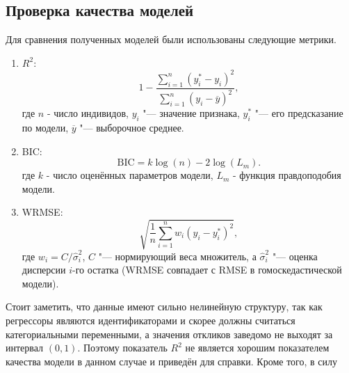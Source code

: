 \documentclass{article}
\begin{document}
\subsection{Проверка качества моделей}
Для сравнения полученных моделей были использованы следующие метрики.
\begin{enumerate}
  \item $R^2$:
    \[
      1 - \frac{\sum_{i=1}^n (y_i^* - y_i)^2}{\sum_{i=1}^{n}(y_i - \overline{y})^2},
    \]
    где $n$ - число индивидов, $y_i$ "--- значение признака,
    $y_i^*$ "--- его предсказание по модели, $\overline{y}$ "--- выборочное среднее.
  \item BIC:
    \[
      \mathrm{BIC} = k \log(n) - 2 \log(L_m).
    \]
    где $k$ - число оценённых параметров модели, $L_m$ - функция правдоподобия модели.
  \item WRMSE:
    \[
      \sqrt{\frac{1}{n}\sum_{i=1}^{n}w_i(y_i - y_i^*)^2},
    \]
    где $w_i = C / \widehat{\sigma}_i^2$, $C$ "--- нормирующий веса множитель,
    а $\widehat{\sigma}_i^2$ "--- оценка дисперсии $i$-го остатка
    (WRMSE совпадает с RMSE в гомоскедастической модели).
\end{enumerate}
Стоит заметить, что данные имеют сильно нелинейную структуру, так как регрессоры
являются идентификаторами и скорее должны считаться категориальными переменными,
а значения откликов заведомо не выходят за интервал $(0, 1)$.
Поэтому показатель $R^2$ не является хорошим показателем качества
модели в данном случае и приведён для справки.
Кроме того, в силу
\end{document}
